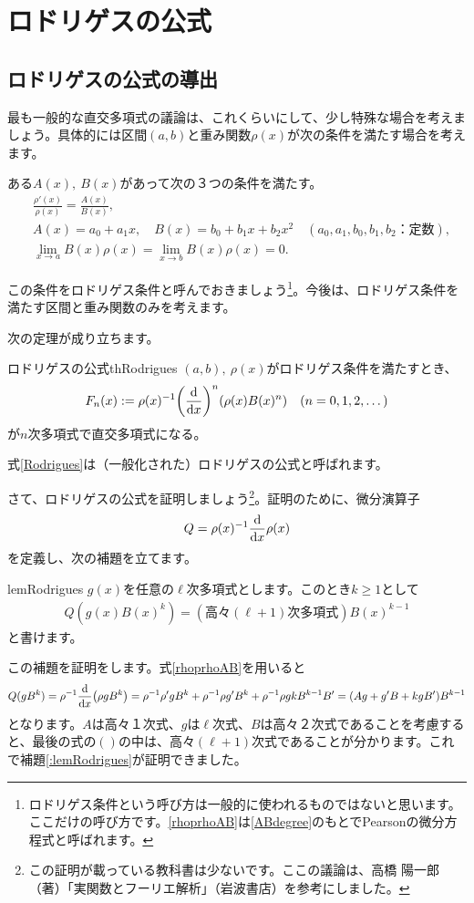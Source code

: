\documentclass[report,paper=a4, fontsize=12pt, line_length=16cm, number_of_lines=33,dvipdfmx]{jlreq}
\newenvironment{myquote}{\begin{tcolorbox}[
  colback = blue!5, after = \noindent] }{\end{tcolorbox}}
\numberwithin{equation}{section}
\begin{document}
\section{ロドリゲスの公式}
\subsection{ロドリゲスの公式の導出}
最も一般的な直交多項式の議論は、これくらいにして、少し特殊な場合を考えましょう。具体的には区間$(a,b)$と重み関数$\rho(x)$が次の条件を満たす場合を考えます。
\begin{myquote}
ある$A(x),\ B(x)$があって次の３つの条件を満たす。
\begin{align}
 & \frac{\rho'(x)}{\rho(x)}=\frac{A(x)}{B(x)},\label{rhoprhoAB}\\
 & A(x)=a_0+a_1 x,\quad B(x)=b_0+b_1x + b_2 x^2\quad (a_0,a_1,b_0,b_1,b_2\text{：定数}),\label{ABdegree}\\
 & \lim_{x\to a}B(x)\rho(x)=\lim_{x\to b}B(x)\rho(x)=0.\label{surface}
\end{align}
\end{myquote}
この条件をロドリゲス条件と呼んでおきましょう\footnote{ロドリゲス条件という呼び方は一般的に使われるものではないと思います。ここだけの呼び方です。\eqref{rhoprhoAB}は\eqref{ABdegree}のもとでPearsonの微分方程式と呼ばれます。}。今後は、ロドリゲス条件を満たす区間と重み関数のみを考えます。

次の定理が成り立ちます。
\begin{theor}{ロドリゲスの公式}{thRodrigues}
$(a,b),\ \rho(x)$がロドリゲス条件を満たすとき、
\begin{align}
  F_n(x):=\rho(x)^{-1}\qty(\dv{x})^n\qty(\rho(x)B(x)^n)\quad (n=0,1,2,\dots)\label{Rodrigues}
\end{align}  
が$n$次多項式で直交多項式になる。
\end{theor}
式\eqref{Rodrigues}は（一般化された）ロドリゲスの公式と呼ばれます。

さて、ロドリゲスの公式を証明しましょう\footnote{この証明が載っている教科書は少ないです。ここの議論は、高橋 陽一郎（著）「実関数とフーリエ解析」（岩波書店）を参考にしました。}。証明のために、微分演算子
\begin{align}
  Q=\rho(x)^{-1}\dv{x} \rho(x)\label{RodriguesQ}
\end{align}
を定義し、次の補題を立てます。
\begin{lemma}{}{lemRodrigues}
  $g(x)$を任意の$\ell$次多項式とします。このとき$k\ge 1$として
  \begin{align}
    Q(g(x)B(x)^{k})=(\text{高々}(\ell+1)\text{次多項式})B(x)^{k-1}
  \end{align}
  と書けます。
\end{lemma}
この補題を証明をします。式\eqref{rhoprhoAB}を用いると
\begin{align}
  Q(g B^{k})=\rho^{-1}\dv{x}(\rho g B^k)
  =\rho^{-1}\rho' g B^k+ \rho^{-1}\rho g' B^k+\rho^{-1}\rho g kB^{k-1}B'
  =(Ag+g'B+kgB')B^{k-1}
\end{align}
となります。$A$は高々１次式、$g$は$\ell$次式、$B$は高々２次式であることを考慮すると、最後の式の$()$の中は、高々$(\ell+1)$次式であることが分かります。これで補題\ref{:lemRodrigues}が証明できました。
\end{document}
